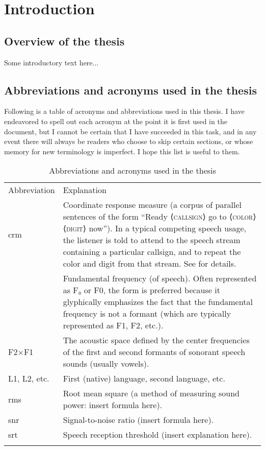 \chapter{Introduction}
\section[Overview]{Overview of the thesis \label{sec:Overview}}
Some introductory text here...

\section[Abbreviations \& acronyms]{Abbreviations and acronyms used in the thesis \label{sec:Abbr}}
Following is a table of acronyms and abbreviations used in this thesis.  I have endeavored to spell out each acronym at the point it is first used in the document, but I cannot be certain that I have succeeded in this task, and in any event there will always be readers who choose to skip certain sections, or whose memory for new terminology is imperfect.  I hope this list is useful to them.

\begin{table}
	\caption[Abbreviations and acronyms]{Abbreviations and acronyms used in the thesis \label{tab:Abbr}}
	\centering
	\begin{tabu} to \textwidth [c]{X[c m] X[5 m]}
		\toprule
		\everyrow{\midrule}
		\rowfont[c]{\bfseries} Abbreviation & Explanation\\
		\ac{crm} & Coordinate response measure (a corpus of parallel sentences of the form “Ready ⟨\textsc{callsign}⟩ go to ⟨\textsc{color}⟩ ⟨\textsc{digit}⟩ now”).  In a typical competing speech usage, the listener is told to attend to the speech stream containing a particular callsign, and to repeat the color and digit from that stream.  See \citet{BoliaEtAl2000} for details.\\
		\fo & Fundamental frequency (of speech).  Often represented as F₀ or F0, the form \fo{} is preferred because it glyphically emphasizes the fact that the fundamental frequency is not a formant (which are typically represented as F1, F2, etc.).\\
		F2×F1 & The acoustic space defined by the center frequencies of the first and second formants of sonorant speech sounds (usually vowels).\\
		L1, L2, etc. & First (native) language, second language, etc.\\
		\ac{rms} & Root mean square (a method of measuring sound power: insert formula here).\\
		\ac{snr} & Signal-to-noise ratio (insert formula here).\\
		\everyrow{}
		\ac{srt} & Speech reception threshold (insert explanation here).\\
		\bottomrule
	\end{tabu}
\end{table}
